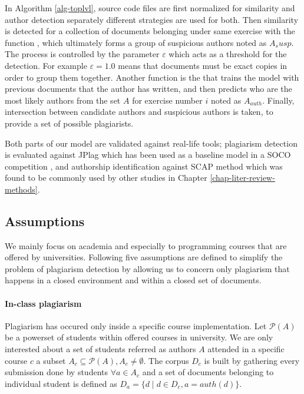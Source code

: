 \noindent
In Algorithm \ref{alg-toplvl}, source code files are first normalized for similarity and author detection separately \ie different strategies are used for both. Then similarity is detected for a collection of documents belonging under same exercise with the function , which ultimately forms a group of suspicious authors noted as $A_susp$. The process is controlled by the parameter $\varepsilon$ which acts as a threshold for the detection. For example $\varepsilon = 1.0$ means that documents must be exact copies in order to group them together. Another function is the  that trains the model with previous documents that the author has written, and then predicts who are the most likely authors from the set $A$ for exercise number $i$ noted as $A_{auth}$. Finally, intersection between candidate authors and suspicious authors is taken, to provide a set of possible plagiarists. 

Both parts of our model are validated against real-life tools; plagiarism detection is evaluated against JPlag \cite{prechelt2002finding} which has been used as a baseline model in a SOCO competition \cite{saez2014pan}, and authorship identification against SCAP method which was found to be commonly used by other studies in Chapter \ref{chap-liter-review-methods}.

\subsection{Assumptions}

We mainly focus on academia and especially to programming courses that are offered by 
universities. Following five assumptions are defined to simplify the problem of plagiarism
detection by allowing us to concern only plagiarism that happens in a closed environment and within a closed set of documents. 

\paragraph{In-class plagiarism} Plagiarism has occured only inside a 
specific course implementation. Let $\mathcal{P}(A)$ be a powerset of students within offered courses in university. We are only interested about a set of students referred as authors $A$ attended in a specific course $c$ \ie a subset $A_c \subseteq \mathcal{P}(A), A_c \neq \emptyset$. The corpus $D_c$ is built by gathering every submission done by students $\forall a \in A_c$ and a set of documents belonging to individual student is defined as $D_a = \{d \mid d \in D_c, a = auth(d)\}$. 


